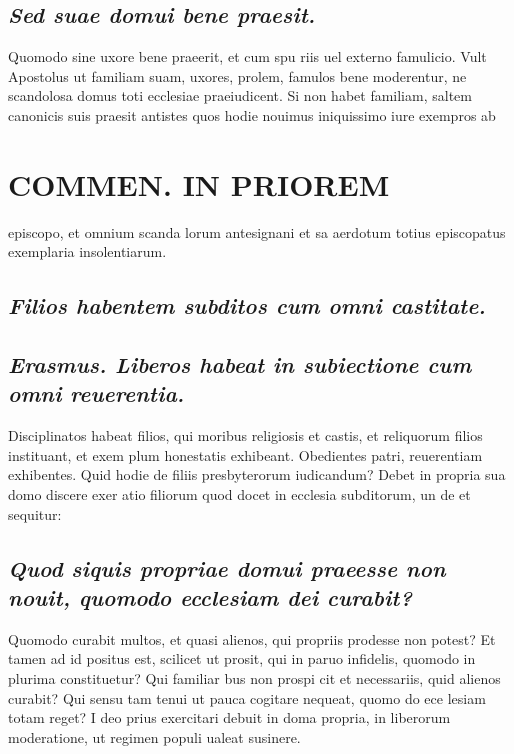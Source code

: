 \documentclass{article}
\begin{document}
\begin{pages}
\subsection*{\textit{Sed suae domui bene praesit. }}\pstart Quomodo sine uxore bene praeerit, et cum spu riis uel externo famulicio. Vult Apostolus ut familiam suam, uxores, prolem, famulos bene moderentur, ne scandolosa domus toti ecclesiae praeiudicent. Si non habet familiam, saltem canonicis suis praesit antistes quos hodie nouimus iniquissimo iure exempros ab  \pend
\section*{COMMEN. IN PRIOREM }
\marginpar{[ p.78 ]}\pstart episcopo, et omnium scanda lorum antesignani et sa aerdotum totius episcopatus exemplaria insolentiarum.  \pend
{}
{}
\subsection*{\textit{Filios habentem subditos cum omni castitate. }}
{}
\subsection*{\textit{Erasmus. Liberos habeat in subiectione cum omni reuerentia. }}\pstart Disciplinatos habeat filios, qui moribus religiosis et castis, et reliquorum filios instituant, et exem plum honestatis exhibeant. Obedientes patri, reuerentiam exhibentes. Quid hodie de filiis presbyterorum iudicandum? Debet in propria sua domo discere exer atio filiorum quod docet in ecclesia subditorum, un de et sequitur:  \pend
{}
{}
\subsection*{\textit{Quod siquis propriae domui praeesse non nouit, quomodo ecclesiam dei curabit? }}\pstart Quomodo curabit multos, et quasi alienos, qui propriis prodesse non potest? Et tamen ad id positus est, scilicet ut prosit, qui in paruo infidelis, quomodo in plurima constituetur? Qui familiar bus non prospi cit et necessariis, quid alienos curabit? Qui sensu tam tenui ut pauca cogitare nequeat, quomo do ece lesiam totam reget? I deo prius exercitari debuit in doma propria, in liberorum moderatione, ut regimen populi ualeat susinere.  \pend

\end{pages}
\end{document}
